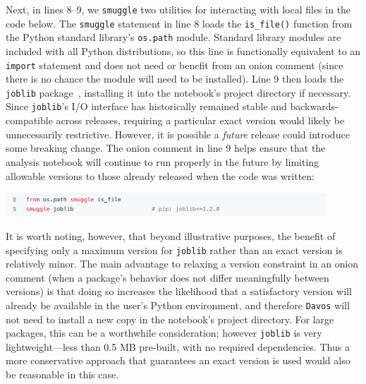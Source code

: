 \documentclass[preprint,12pt,a4paper]{elsarticle}
\begin{document}
Next, in lines 8--9, we \texttt{smuggle} two
utilities for interacting with local files in the code below. The
\texttt{smuggle} statement in line 8 loads the \texttt{is\_file()}
function from the Python standard library's \texttt{os.path}
module. Standard library modules are included with all Python
distributions, so this line is functionally equivalent to an
\texttt{import} statement and does not need or benefit from an onion
comment (since there is no chance the module will need to be installed).
Line 9 then loads the \texttt{joblib} package~\cite{Varo10},
installing it into the notebook's project directory if necessary. Since \texttt{joblib}'s I/O
interface has historically remained stable and backwards-compatible
across releases, requiring a particular exact version
would likely be unnecessarily restrictive. However, it is possible a
\textit{future} release could introduce some breaking change.  The
onion comment in line 9 helps ensure that the analysis notebook will continue
to run properly in the future by limiting allowable versions to those
already released when the code was written:
\begin{center}
\includegraphics[width=0.9\textwidth]{figs/example2}
\end{center}
It is worth noting, however, that beyond illustrative purposes, the benefit of specifying only a maximum version for \texttt{joblib} rather than an exact version is relatively minor.
The main advantage to relaxing a version constraint in an onion comment (when a package's behavior does not differ meaningfully between versions) is that doing so increases the likelihood that a satisfactory version will already be available in the user's Python environment, and therefore \texttt{Davos} will not need to install a new copy in the notebook's project directory.
For large packages, this can be a worthwhile consideration; however \texttt{joblib} is very lightweight---less than 0.5 MB pre-built, with no required dependencies.
Thus a more conservative approach that guarantees an exact version is used would also be reasonable in this case.
\end{document}
